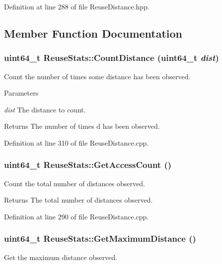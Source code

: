 Definition at line 288 of file ReuseDistance.hpp.



\subsection{Member Function Documentation}
\hypertarget{class_reuse_stats_abdb92b77ec7191be80e77a34f894e11b}{
\subsubsection[{CountDistance}]{\setlength{\rightskip}{0pt plus 5cm}uint64\_\-t ReuseStats::CountDistance (uint64\_\-t {\em dist})}}
\label{class_reuse_stats_abdb92b77ec7191be80e77a34f894e11b}
Count the number of times some distance has been observed.


\begin{DoxyParams}{Parameters}
\item[{\em dist}]The distance to count.\end{DoxyParams}
\begin{DoxyReturn}{Returns}
The number of times d has been observed. 
\end{DoxyReturn}


Definition at line 310 of file ReuseDistance.cpp.

\hypertarget{class_reuse_stats_a48935d131ce635b1b37b2a43f0c52217}{
\subsubsection[{GetAccessCount}]{\setlength{\rightskip}{0pt plus 5cm}uint64\_\-t ReuseStats::GetAccessCount ()}}
\label{class_reuse_stats_a48935d131ce635b1b37b2a43f0c52217}
Count the total number of distances observed.

\begin{DoxyReturn}{Returns}
The total number of distances observed. 
\end{DoxyReturn}


Definition at line 290 of file ReuseDistance.cpp.

\hypertarget{class_reuse_stats_ac70175a532ea2dc608e0fd2f04e4fcbb}{
\subsubsection[{GetMaximumDistance}]{\setlength{\rightskip}{0pt plus 5cm}uint64\_\-t ReuseStats::GetMaximumDistance ()}}
\label{class_reuse_stats_ac70175a532ea2dc608e0fd2f04e4fcbb}
Get the maximum distance observed.

